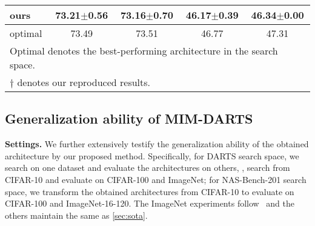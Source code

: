 \documentclass[10pt,twocolumn,letterpaper]{article}
\newcommand{\mypara}[1]{\vspace{1mm}\noindent\textbf{#1}}
\begin{document}
\begin{table}
\begin{center}
{\begin{tabular}{lcccc}
          ours                                                                & \textbf{73.21$\pm$0.56} & \textbf{73.16$\pm$0.70}  & 46.17$\pm$0.39          & \textbf{46.34$\pm$0.00} \\
          \midrule
          optimal                                                               & 73.49               & 73.51               & 46.77               & 47.31               \\ 
          \bottomrule
          \multicolumn{5}{l}{ \small
          Optimal denotes the best-performing architecture in the search space.} \\
           \multicolumn{5}{l}{ \small $\dagger$ denotes our reproduced results. }
        \end{tabular}      }
        \label{tab:nas201_transform}
      \end{center}
      \vspace{-4pt}
\end{table} 
\subsection{Generalization ability of MIM-DARTS}
\vspace{-4pt}
\label{sec:generalization}
\mypara{Settings.}
We further extensively testify the generalization ability of the obtained architecture by our proposed method.
Specifically, for DARTS search space, we search on one dataset and evaluate the architectures on others, \eg, search from CIFAR-10 and evaluate on CIFAR-100 and ImageNet;
for NAS-Bench-201 search space, we transform the obtained architectures from CIFAR-10 to evaluate on CIFAR-100 and ImageNet-16-120.
The ImageNet experiments follow~\cite{Zhang_2021_rlnas} and the others maintain the same as \cref{sec:sota}.
\end{document}
